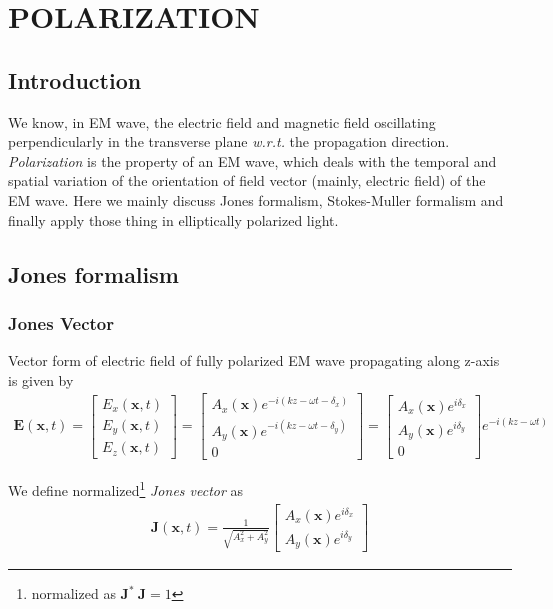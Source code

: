 \documentclass[11pt,a4paper]{article}
\numberwithin{equation}{section}
\begin{document}

\section{POLARIZATION}
\subsection{Introduction}
We know, in EM wave, the electric field and magnetic field oscillating perpendicularly in the transverse plane \textit{w.r.t.} the propagation direction. \textit{Polarization} is the property of an EM wave, which deals with the temporal and spatial variation of the orientation of field vector (mainly,  electric field) of the EM wave. Here we mainly discuss Jones formalism, Stokes-Muller formalism and finally apply those thing in elliptically polarized light.

\subsection{Jones formalism}
\subsubsection{Jones Vector}
Vector form of electric field of fully polarized EM wave propagating along z-axis is given by
\begin{align}
	\boldsymbol{E}(\boldsymbol{x},t)=
	\begin{bmatrix}
		E_x(\boldsymbol{x},t)\\
		E_y(\boldsymbol{x},t)\\
		E_z(\boldsymbol{x},t)
	\end{bmatrix} =
\begin{bmatrix}
	A_x(\boldsymbol{x}) e^{-i(kz-\omega t-\delta_x)}\\
	A_y(\boldsymbol{x}) e^{-i(kz-\omega t-\delta_y)}\\
	0
\end{bmatrix}=
\begin{bmatrix}
	A_x(\boldsymbol{x})e^{i\delta_x}\\
	A_y(\boldsymbol{x})e^{i\delta_y}\\
	0
\end{bmatrix}e^{-i(kz-\omega t)}
\end{align}

We define normalized\footnote{normalized as $\boldsymbol{J}^\ast\:\boldsymbol{J}=1$} \textit{Jones vector} as
\begin{align}
	\boldsymbol{J}(\boldsymbol{x},t)=\frac{1}{\sqrt{A_x^2+A_y^2}}
	\begin{bmatrix}
		A_x(\boldsymbol{x})e^{i\delta_x}\\
		A_y(\boldsymbol{x})e^{i\delta_y}
	\end{bmatrix}
\end{align}
\end{document}
